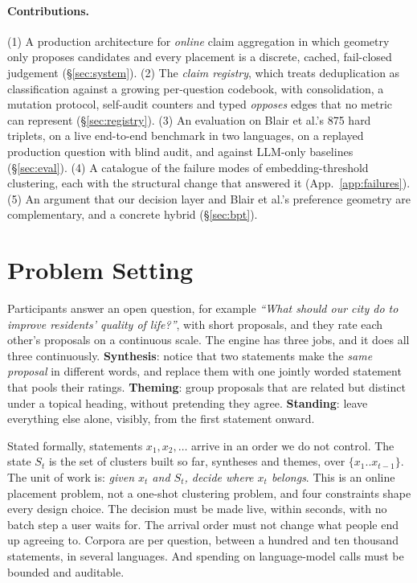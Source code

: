 \documentclass{article}
\newcommand{\bpt}{Blair et al.\xspace}
\begin{document}
\paragraph{Contributions.}
(1) A production architecture for \emph{online} claim aggregation in which geometry only proposes candidates and every placement is a discrete, cached, fail-closed judgement (\S\ref{sec:system}). (2) The \emph{claim registry}, which treats deduplication as classification against a growing per-question codebook, with consolidation, a mutation protocol, self-audit counters and typed \emph{opposes} edges that no metric can represent (\S\ref{sec:registry}). (3) An evaluation on \bpt's 875 hard triplets, on a live end-to-end benchmark in two languages, on a replayed production question with blind audit, and against LLM-only baselines (\S\ref{sec:eval}). (4) A catalogue of the failure modes of embedding-threshold clustering, each with the structural change that answered it (App.~\ref{app:failures}). (5) An argument that our decision layer and \bpt's preference geometry are complementary, and a concrete hybrid (\S\ref{sec:bpt}).

\section{Problem Setting}
\label{sec:problem}

Participants answer an open question, for example \emph{``What should our city do to improve residents' quality of life?''}, with short proposals, and they rate each other's proposals on a continuous scale. The engine has three jobs, and it does all three continuously. \textbf{Synthesis}: notice that two statements make the \emph{same proposal} in different words, and replace them with one jointly worded statement that pools their ratings. \textbf{Theming}: group proposals that are related but distinct under a topical heading, without pretending they agree. \textbf{Standing}: leave everything else alone, visibly, from the first statement onward.

Stated formally, statements $x_1, x_2, \dots$ arrive in an order we do not control. The state $S_t$ is the set of clusters built so far, syntheses and themes, over $\{x_1..x_{t-1}\}$. The unit of work is: \emph{given $x_t$ and $S_t$, decide where $x_t$ belongs}. This is an online placement problem, not a one-shot clustering problem, and four constraints shape every design choice. The decision must be made live, within seconds, with no batch step a user waits for. The arrival order must not change what people end up agreeing to. Corpora are per question, between a hundred and ten thousand statements, in several languages. And spending on language-model calls must be bounded and auditable.
\end{document}
